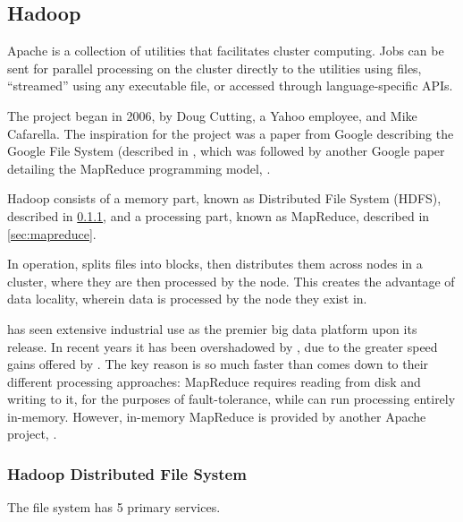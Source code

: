 \subsection{Hadoop}\label{sec:hadoop-1}

Apache  is a collection of utilities that facilitates cluster computing.
Jobs can be sent for parallel processing on the cluster directly to the utilities using  files, ``streamed'' using any executable file, or accessed through language-specific APIs.

The project began in 2006, by Doug Cutting, a Yahoo employee, and Mike Cafarella.
The inspiration for the project was a paper from Google describing the Google File System (described in \textcite{ghemawat2003google}, which was followed by another Google paper detailing the MapReduce programming model, \textcite{dean2004mapreduce}.

Hadoop consists of a memory part, known as  Distributed File System (HDFS), described in \cref{sec:hdfs}, and a processing part, known as MapReduce, described in \cref{sec:mapreduce}.

In operation,  splits files into blocks, then distributes them across nodes in a cluster, where they are then processed by the node.
This creates the advantage of data locality, wherein data is processed by the node they exist in.

 has seen extensive industrial use as the premier big data
platform upon its release.
In recent years it has been overshadowed by , due to the greater speed gains offered by .
The key reason  is so much faster than  comes down to their different processing approaches:  MapReduce requires reading from disk and writing to it, for the purposes of fault-tolerance, while  can run processing entirely in-memory.
However, in-memory MapReduce is provided by another Apache project, \cite{zheludkov2017high}.

\subsubsection{Hadoop Distributed File System}\label{sec:hdfs}

The file system has 5 primary services.

